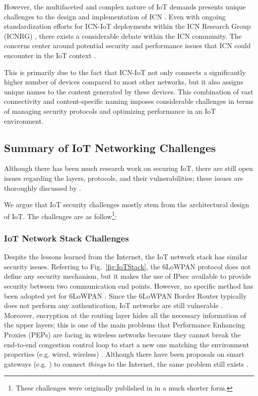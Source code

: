 \documentclass{ieeeaccess}
\begin{document}
However, the multifaceted and complex nature of IoT demands presents unique challenges to the design and implementation of ICN \cite{amadeo2016information}. Even with ongoing standardization efforts for ICN-IoT deployments within the ICN Research Group (ICNRG) \cite{irtf-icnrg-icniot-03}, there exists a considerable debate within the ICN community. The concerns center around potential security and performance issues that ICN could encounter in the IoT context \cite{amadeo2016information,fang2018survey}.

This is primarily due to the fact that ICN-IoT not only connects a significantly higher number of devices compared to most other networks, but it also assigns unique names to the content generated by these devices. This combination of vast connectivity and content-specific naming imposes considerable challenges in terms of managing security protocols and optimizing performance in an IoT environment. 

\subsection{Summary of IoT Networking Challenges} \label{sec:from-prev}

Although there has been much research work on securing IoT, there are still open issues regarding the layers, protocols, and their vulnerabilities; these issues are thoroughly discussed by \cite{7005393, yang2017survey}. 
% 

We argue that IoT security challenges mostly stem from the architectural design of IoT. The challenges are as follow\footnote{These challenges were originally published in \cite{ramezanifarkhani2018securing} in a much shorter form.}:

\subsubsection{IoT Network Stack Challenges}
Despite the lessons learned from the Internet, the IoT network stack has similar security issues.	 
Referring to Fig.~\ref{fig:IoTStack}, the 6LoWPAN protocol does not define any security mechanism, but it makes the use of IPsec available to provide security between two communication end points. However, no specific method has been adopted yet for 6LoWPAN \cite{7005393}. Since the 6LoWPAN Border Router typically does not perform any authentication, IoT networks are still vulnerable \cite{yang2017survey}. Moreover, encryption at the routing layer hides all the necessary information of the upper layers; this is one of the main problems that Performance Enhancing Proxies (PEPs) \cite{caini2007pepsal} are facing in wireless networks because they cannot break the end-to-end congestion control loop to start a new one matching the environment properties (e.g. wired, wireless) \cite{thai2011satern}. Although there have been proposals on smart gateways (e.g. \cite{bimschas2010middleware,7931688}) to connect \textit{things} to the Internet, the same problem still exists \cite{7005393}.
\end{document}
